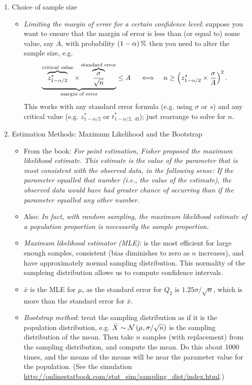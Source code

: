 \begin{enumerate}[label=\textbf{\S~\arabic*}, ref=\S~\arabic*]
\begin{enumerate}[label=\textbf{\S~5.\arabic*}, ref=\S~5.\arabic*]
        \item Choice of sample size
        \begin{itemize}
            \item \textit{Limiting the margin of error for a certain confidence level}: suppose you want to ensure that the margin of error is less than (or equal to) some value, say $A$, with probability $\left( 1 - \alpha\right)\%$ then you need to alter the sample size, e.g.
            \begin{align*}
                \underbrace{\overbrace{z^*_{1 - \alpha/2}}^{\text{critical value}} \times \overbrace{\frac{\sigma}{\sqrt{n}}}^{\text{standard error}}}_{\text{margin of error}} &\leq A & &\iff & n &\geq \left( z^*_{1 - \alpha/2} \times \frac{\sigma}{A}\right)^2.
            \end{align*}
            This works with any standard error formula (e.g. using $\sigma$ or $s$) and any critical value (e.g. $z^*_{1 - \alpha/2}$ or $t^*_{1 - \alpha/2, \text{ df}}$); just rearrange to solve for $n$.
        \end{itemize}
        
        \item Estimation Methods: Maximum Likelihood and the Bootstrap
        \begin{itemize}
            \item From the book: \textit{For point estimation, Fisher proposed the maximum likelihood estimate. This estimate is the value of the parameter that is most consistent with the observed data, in the following sense: If the parameter equalled that number (i.e., the value of the estimate), the observed data would have had greater chance of occurring than if the parameter equalled any other number.} 
            \item Also: \textit{In fact, with random sampling, the maximum likelihood estimate of a population proportion is necessarily the sample proportion.}
            \item \textit{Maximum likelihood estimator (MLE)}: is the most efficient for large enough samples, consistent (bias diminishes to zero as $n$ increases), and have approximately normal sampling distribution. This normality of the sampleing distribution allows us to compute confidence intervals. 
            \item $\bar{x}$ is the MLE for $\mu$, as the standard error for $Q_2$ is $1.25 \sigma /\sqrt{n}$, which is more than the standard error for $\bar{x}$.
            \item \textit{Bootstrap method}: treat the sampling distribution as if it is the population distribution, e.g. $\bar{X}\sim \mathcal{N} \left( \mu, \sigma/\sqrt{n}\right)$ is the sampling distribution of the mean. Then take $n$ samples (with replacement) from the sampling distribution, and compute the mean. Do this about 1000 times, and the means of the means will be near the parameter value for the population. (See the simulation \url{http://onlinestatbook.com/stat_sim/sampling_dist/index.html}.)
        \end{itemize}
    \end{enumerate}
    

\end{enumerate}
